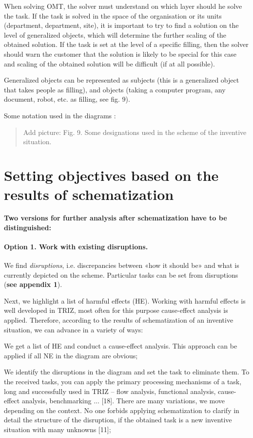 \documentclass[11pt,a4paper]{book}
\newcommand{\addpicture}[1]{
  \begin{quote} Add picture: #1\end{quote}
}
\begin{document}
When solving OMT, the solver must understand on which layer should he solve
the task.  If the task is solved in the space of the organisation or its units
(department, department, site), it is important to try to find a solution on
the level of generalized objects, which will determine the further scaling of
the obtained solution.  If the task is set at the level of a specific filling,
then the solver should warn the customer that the solution is likely to be
special for this case and scaling of the obtained solution will be difficult
(if at all possible).

Generalized objects can be represented as subjects (this is a generalized
object that takes people as filling), and objects (taking a computer program,
any document, robot, etc. as filling, see fig. 9).

Some notation used in the diagrams :

\addpicture{Fig. 9. Some designations used in the scheme of the inventive
  situation.} 

\section{Setting objectives based on the results of schematization}

\textbf{Two versions for further analysis after schematization have to be
  distinguished:} 

\paragraph{Option 1. Work with existing disruptions.}
We find \emph{disruptions}, i.e.  discrepancies between «how it should be» and
what is currently depicted on the scheme. Particular tasks can be set from
disruptions (\textbf{see appendix 1}).

Next, we highlight a list of harmful effects (HE). Working with harmful
effects is well developed in TRIZ, most often for this purpose cause-effect
analysis is applied. Therefore, according to the results of schematization of
an inventive situation, we can advance in a variety of ways:

We get a list of HE and conduct a cause-effect analysis. This approach can be
applied if all NE in the diagram are obvious;

We identify the disruptions in the diagram and set the task to eliminate them.
To the received tasks, you can apply the primary processing mechanisms of a
task, long and successfully used in TRIZ -- flow analysis, functional
analysis, cause-effect analysis, benchmarking ... [18]. There are many
variations, we move depending on the context. No one forbids applying
schematization to clarify in detail the structure of the disruption, if the
obtained task is a new inventive situation with many unknowns [11];
\end{document}
